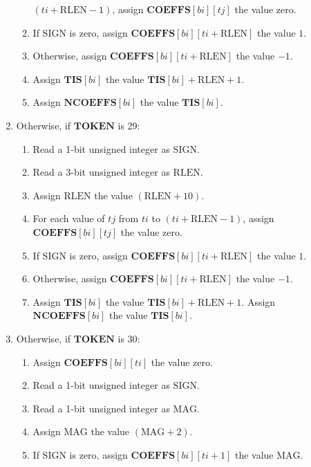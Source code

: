 \documentclass[9pt,letterpaper]{book}
\newcommand{\idx}[1]{{\ensuremath{\mathit{#1}}}}
\newcommand{\bi}{\idx{bi}}
\newcommand{\ti}{\idx{ti}}
\newcommand{\tj}{\idx{tj}}
\newcommand{\bitvar}[1]{\ensuremath{\mathbf{\bm{#1}}}}
\newcommand{\locvar}[1]{\ensuremath{\mathrm{#1}}}
\numberwithin{equation}{chapter}
\numberwithin{figure}{chapter}
\numberwithin{table}{chapter}
\begin{document}
\begin{enumerate}
\begin{enumerate}
 $(\bitvar{\ti}+\locvar{RLEN}-1)$, assign
 $\bitvar{COEFFS}[\bitvar{\bi}][\locvar{\tj}]$ the value zero.
\item
If \locvar{SIGN} is zero, assign
 $\bitvar{COEFFS}[\bitvar{\bi}][\bitvar{\ti}+\locvar{RLEN}]$ the value $1$.
\item
Otherwise, assign $\bitvar{COEFFS}[\bitvar{\bi}][\bitvar{\ti}+\locvar{RLEN}]$
 the value $-1$.
\item
Assign $\bitvar{TIS}[\bitvar{\bi}]$ the value
 $\bitvar{TIS}[\bitvar{\bi}]+\locvar{RLEN}+1$.
\item
Assign $\bitvar{NCOEFFS}[\bitvar{\bi}]$ the value $\bitvar{TIS}[\bitvar{\bi}]$.
\end{enumerate}
\item
Otherwise, if \bitvar{TOKEN} is 29:
\begin{enumerate}
\item
Read a 1-bit unsigned integer as \locvar{SIGN}.
\item
Read a 3-bit unsigned integer as \locvar{RLEN}.
\item
Assign \locvar{RLEN} the value $(\locvar{RLEN}+10)$.
\item
For each value of \locvar{\tj} from \bitvar{\ti} to
 $(\bitvar{\ti}+\locvar{RLEN}-1)$, assign
 $\bitvar{COEFFS}[\bitvar{\bi}][\locvar{\tj}]$ the value zero.
\item
If \locvar{SIGN} is zero, assign
 $\bitvar{COEFFS}[\bitvar{\bi}][\bitvar{\ti}+\locvar{RLEN}]$ the value $1$.
\item
Otherwise, assign $\bitvar{COEFFS}[\bitvar{\bi}][\bitvar{\ti}+\locvar{RLEN}]$
 the value $-1$.
\item
Assign $\bitvar{TIS}[\bitvar{\bi}]$ the value
 $\bitvar{TIS}[\bitvar{\bi}]+\locvar{RLEN}+1$.
Assign $\bitvar{NCOEFFS}[\bitvar{\bi}]$ the value $\bitvar{TIS}[\bitvar{\bi}]$.
\end{enumerate}
\item
Otherwise, if \bitvar{TOKEN} is 30:
\begin{enumerate}
\item
Assign $\bitvar{COEFFS}[\bitvar{\bi}][\locvar{\ti}]$ the value zero.
\item
Read a 1-bit unsigned integer as \locvar{SIGN}.
\item
Read a 1-bit unsigned integer as \locvar{MAG}.
\item
Assign \locvar{MAG} the value $(\locvar{MAG}+2)$.
\item
If \locvar{SIGN} is zero, assign
 $\bitvar{COEFFS}[\bitvar{\bi}][\bitvar{\ti}+1]$ the value $\locvar{MAG}$.

\end{enumerate}
\end{enumerate}
\end{document}
